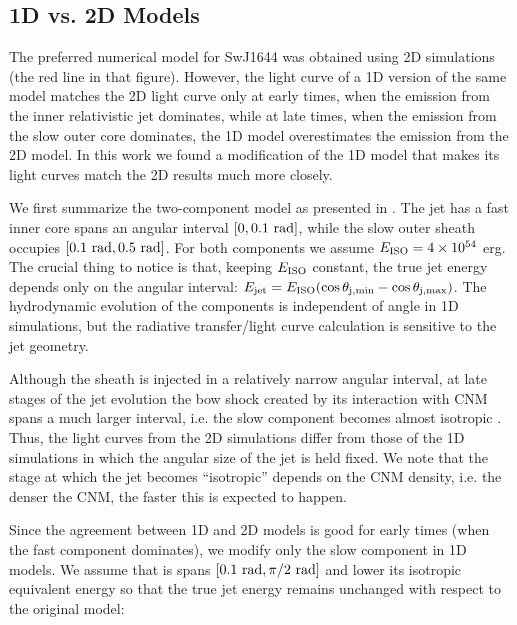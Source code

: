 \documentclass[usenatbib,fleqn]{mnras}
\begin{document}
\subsection{1D vs. 2D Models}
\label{sec:2D}

The preferred numerical model for SwJ1644 \citep[Fig.10
in][]{Mimica+2015} was obtained using 2D simulations (the red line in
that figure). However, the light curve of a 1D version of the same
model \citep[black line in Fig. 10 in][see also section 4.2 of that
paper]{Mimica+2015} matches the 2D light curve only at early times,
when the emission from the inner relativistic jet dominates, while at
late times, when the emission from the slow outer core dominates, the
1D model overestimates the emission from the 2D model. In this work we
found a modification of the 1D model that makes its light curves
match the 2D results much more closely.

We first summarize the two-component model as presented in
\citet{Mimica+2015}. The jet has a fast inner core spans an angular
interval $[0, 0.1\ {\rm rad}]$, while the slow outer sheath occupies
$[0.1\ {\rm rad}, 0.5\ {\rm rad}]$. For both components we assume
$E_{\rm ISO} = 4\times 10^{54}$ erg. The crucial thing to notice is
that, keeping $E_{\rm ISO}$ constant, the true jet energy depends only
on the angular interval: $E_{\rm jet} = E_{\rm ISO} (\cos\theta_{\rm
  j,min} - \cos\theta_{\rm j,max})$. The hydrodynamic evolution of the
components is independent of angle in 1D simulations, but the
radiative transfer/light curve calculation is sensitive to the jet
geometry.

Although the sheath is injected in a relatively
narrow angular interval, at late stages of the jet evolution the bow
shock created by its interaction with CNM spans a much larger interval,
i.e. the slow component becomes almost isotropic \citep[bottom two
panels in Fig. 8 in][]{Mimica+2015}. Thus, the light curves from the
2D simulations differ from those of the 1D simulations in which the
angular size of the jet is held fixed. We note that the stage at
which the jet becomes ``isotropic'' depends on the CNM density,
i.e. the denser the CNM, the faster this is expected to happen.

Since the agreement between 1D and 2D models is good for early times
(when the fast component dominates), we modify only the slow component
in 1D models. We assume that is spans $[0.1\ {\rm rad}, \pi/2\ {\rm
  rad}]$ and lower its isotropic equivalent energy so that the true
jet energy remains unchanged with respect to the original model:
\end{document}
